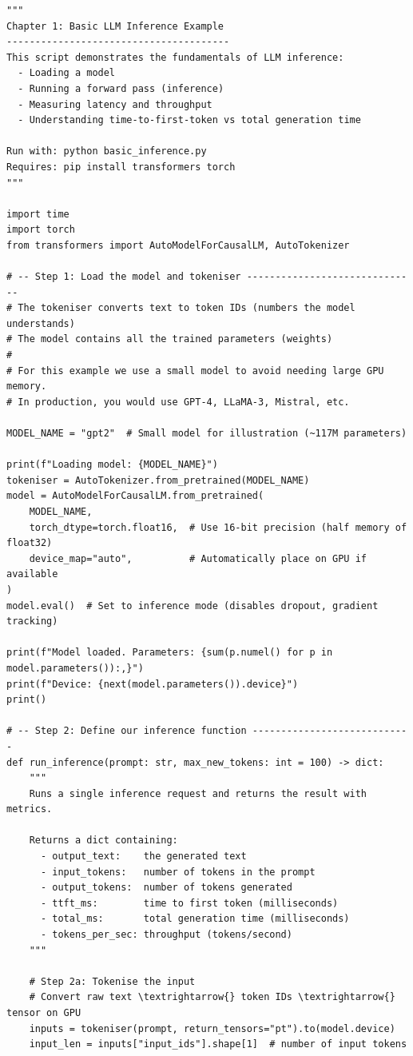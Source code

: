 \documentclass[12pt, twoside, openright]{book}
\begin{document}
\begin{lstlisting}[style=pythonstyle,
  caption={Simple LLM inference with performance measurement},
  label={lst:basic-inference}]
"""
Chapter 1: Basic LLM Inference Example
---------------------------------------
This script demonstrates the fundamentals of LLM inference:
  - Loading a model
  - Running a forward pass (inference)
  - Measuring latency and throughput
  - Understanding time-to-first-token vs total generation time

Run with: python basic_inference.py
Requires: pip install transformers torch
"""

import time
import torch
from transformers import AutoModelForCausalLM, AutoTokenizer

# -- Step 1: Load the model and tokeniser ------------------------------
# The tokeniser converts text to token IDs (numbers the model understands)
# The model contains all the trained parameters (weights)
#
# For this example we use a small model to avoid needing large GPU memory.
# In production, you would use GPT-4, LLaMA-3, Mistral, etc.

MODEL_NAME = "gpt2"  # Small model for illustration (~117M parameters)

print(f"Loading model: {MODEL_NAME}")
tokeniser = AutoTokenizer.from_pretrained(MODEL_NAME)
model = AutoModelForCausalLM.from_pretrained(
    MODEL_NAME,
    torch_dtype=torch.float16,  # Use 16-bit precision (half memory of float32)
    device_map="auto",          # Automatically place on GPU if available
)
model.eval()  # Set to inference mode (disables dropout, gradient tracking)

print(f"Model loaded. Parameters: {sum(p.numel() for p in model.parameters()):,}")
print(f"Device: {next(model.parameters()).device}")
print()

# -- Step 2: Define our inference function ----------------------------
def run_inference(prompt: str, max_new_tokens: int = 100) -> dict:
    """
    Runs a single inference request and returns the result with metrics.

    Returns a dict containing:
      - output_text:    the generated text
      - input_tokens:   number of tokens in the prompt
      - output_tokens:  number of tokens generated
      - ttft_ms:        time to first token (milliseconds)
      - total_ms:       total generation time (milliseconds)
      - tokens_per_sec: throughput (tokens/second)
    """

    # Step 2a: Tokenise the input
    # Convert raw text \textrightarrow{} token IDs \textrightarrow{} tensor on GPU
    inputs = tokeniser(prompt, return_tensors="pt").to(model.device)
    input_len = inputs["input_ids"].shape[1]  # number of input tokens


\end{lstlisting}
\end{document}
